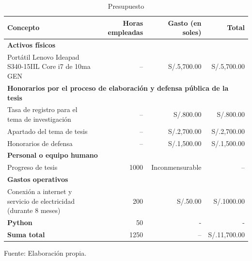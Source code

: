 \begin{table}[h!]
	\caption{Presupuesto}
	\label{tab:presupuesto}
	\centering
	\small
	\begin{tabular}{p{6cm}rrr}
		\toprule
		\textbf{Concepto} & \textbf{Horas empleadas} & \textbf{Gasto (en soles)} & \textbf{Total} \\
		\midrule
		\multicolumn{4}{l}{\textbf{Activos físicos}} \\
		Portátil Lenovo Ideapad S340-15IIL Core i7 de 10ma GEN & -- & S/.5,700.00 & S/.5,700.00 \\
		\midrule
		\multicolumn{4}{l}{\textbf{Honorarios por el proceso de elaboración y defensa pública de la tesis}} \\
		Tasa de registro para el tema de investigación & -- & S/.800.00 & S/.800.00 \\
		Apartado del tema de tesis & -- & S/.2,700.00 & S/.2,700.00 \\
		Honorarios de defensa & -- & S/.1,500.00 & S/.1,500.00 \\
		\midrule
		\multicolumn{4}{l}{\textbf{Personal o equipo humano}} \\
		Progreso de tesis & 1000 & Inconmensurable & -- \\
		\midrule
		\multicolumn{4}{l}{\textbf{Gastos operativos}} \\
		Conexión a internet y servicio de electricidad (durante 8 meses) & 200 & S/.50.00 & S/.1000.00 \\
		\midrule
		\textbf{Python} & 50 & - & - \\
		\midrule
		\textbf{Suma total} & 1250 & -- & S/.11,700.00 \\
		\bottomrule
	\end{tabular}
	\begin{flushleft}
		\small Fuente: Elaboración propia.
	\end{flushleft}
\end{table}





